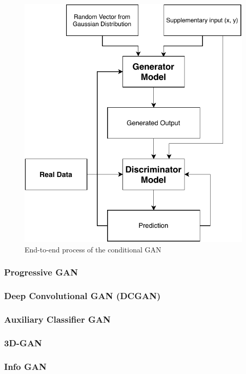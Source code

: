 \documentclass[conference]{IEEEtran}
\begin{document}
\begin{figure}[!h]
    \centerline{\includegraphics[scale=0.6]{figures/CGAN.pdf}}
    \caption{End-to-end process of the conditional GAN}
    \label{fig2}
\end{figure}

\subsubsection{Progressive GAN}

\subsubsection{Deep Convolutional GAN (DCGAN)}

\subsubsection{Auxiliary Classifier GAN}

\subsubsection{3D-GAN}

\subsubsection{Info GAN}
\end{document}
